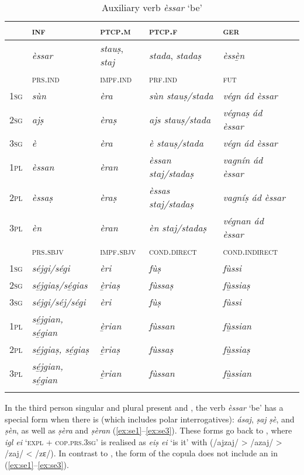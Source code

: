 \begin{table}
	\caption{Auxiliary verb \textit{èssar} `be'}
	\label{tab:aux:èssar}
	\begin{tabular}{llllll}
		\lsptoprule
		& \textsc{inf}  & \textsc{ptcp.m}  & \textsc{ptcp.f}  &  \textsc{ger}\\
		\midrule
		&\textit{èssar} &\textit{stauṣ}, \textit{staj}  & \textit{stada}, \textit{stadaṣ} & \textit{èssè̱n}\\
		\lsptoprule
	&\textsc{prs.ind}  &\textsc{impf.ind} & \textsc{prf.ind} & \textsc{fut}\\
		\midrule
		\textsc{1sg} &\textit{sùn} & \textit{èra} &\textit{sùn stauṣ/stada} &\textit{végn ád èssar}\\
		\textsc{2sg} &\textit{ajṣ} &\textit{èraṣ} &\textit{ajs stauṣ/stada} & \textit{végnaṣ ád èssar}\\
		\textsc{3sg} &\textit{è} & \textit{èra} & \textit{è stauṣ/stada} &\textit{végn ád èssar}\\
		\textsc{1pl} &\textit{èssan} &\textit{èran} & \textit{èssan staj/stadaṣ} &\textit{vagnín ád èssar}\\
		\textsc{2pl} &\textit{èssaṣ} & \textit{èraṣ} & \textit{èssas staj/stadaṣ} &\textit{vagníṣ ád èssar}\\
		\textsc{3pl}& \textit{èn} & \textit{èran} & \textit{èn staj/stadaṣ} & \textit{végnan ád èssar}\\
		\lsptoprule
		&\textsc{prs.sbjv} & \textsc{impf.sbjv}  &\textsc{cond.direct} & \textsc{cond.indirect}\\
		\midrule
		\textsc{1sg} & \textit{séjgi/ségi} & \textit{èri} & \textit{fùṣ} & \textit{fùssi}\\
		\textsc{2sg} & \textit{sé̱jgiaṣ/sé̱gias} & \textit{è̱riaṣ} & \textit{fùssaṣ} & \textit{fù̱ssiaṣ}\\
		\textsc{3sg} & \textit{séjgi/séj/ségi} & \textit{èri} & \textit{fùṣ} & \textit{fùssi}\\
		\textsc{1pl} & \textit{sé̱jgian, sé̱gian} & \textit{è̱rian} & \textit{fùssan} & \textit{fù̱ssian}\\
		\textsc{2pl} &  \textit{sé̱jgiaṣ, sé̱giaṣ} &  \textit{è̱riaṣ} & \textit{fùssaṣ} & \textit{fù̱ssiaṣ}\\
		\textsc{3pl} & \textit{sé̱jgian, sé̱gian} & \textit{è̱rian} & \textit{fùssan} & \textit{fù̱ssian}\\
		\lspbottomrule
	\end{tabular}
\end{table}

In the third person singular and plural present and , the verb \textit{èssar} `be' has a special form when there is  (which includes polar interrogatives): \textit{ásaj}, \textit{ṣaj} \textit{ṣè}, and \textit{ṣèn}, as well as \textit{ṣèra} and \textit{ṣèran} (\ref{ex:se1}--\ref{ex:se3}). These forms go back to , where \textit{igl ei} `\textsc{expl} + \textsc{cop.prs.3sg}' is realised as \textit{eiṣ ei} `is it' with  (/ajzaj/ > /azaj/ > /zaj/ < /zɛ/). In contrast to , the form of the copula does not include an  in (\ref{ex:se1}--\ref{ex:se3}).

